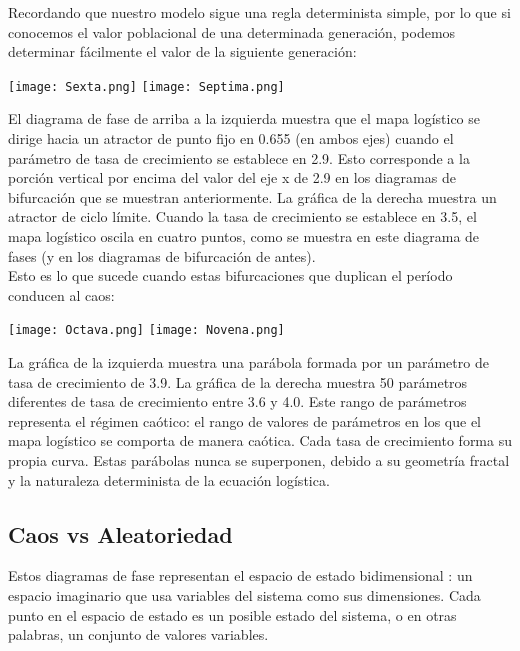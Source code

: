 \documentclass[12pt]{article}
\begin{document}
 Recordando que nuestro modelo sigue una regla determinista simple, por lo que si conocemos el valor poblacional de una determinada generación, podemos determinar fácilmente el valor de la siguiente generación:
 \begin{center}
    \texttt{[image: Sexta.png]} \hspace*{\fill}  \texttt{[image: Septima.png]}
\end{center}
El diagrama de fase de arriba a la izquierda muestra que el mapa logístico se dirige hacia un atractor de punto fijo en 0.655 (en ambos ejes) cuando el parámetro de tasa de crecimiento se establece en 2.9. Esto corresponde a la porción vertical por encima del valor del eje x de 2.9 en los diagramas de bifurcación que se muestran anteriormente. La gráfica de la derecha muestra un atractor de ciclo límite. Cuando la tasa de crecimiento se establece en 3.5, el mapa logístico oscila en cuatro puntos, como se muestra en este diagrama de fases (y en los diagramas de bifurcación de antes).\\

Esto es lo que sucede cuando estas bifurcaciones que duplican el período conducen al caos:
\begin{center}
    \texttt{[image: Octava.png]} \hspace*{\fill}  \texttt{[image: Novena.png]}
\end{center}
La gráfica de la izquierda muestra una parábola formada por un parámetro de tasa de crecimiento de 3.9. La gráfica de la derecha muestra 50 parámetros diferentes de tasa de crecimiento entre 3.6 y 4.0. Este rango de parámetros representa el régimen caótico: el rango de valores de parámetros en los que el mapa logístico se comporta de manera caótica. Cada tasa de crecimiento forma su propia curva. Estas parábolas nunca se superponen, debido a su geometría fractal y la naturaleza determinista de la ecuación logística.
\subsection*{Caos vs Aleatoriedad}
Estos diagramas de fase representan el espacio de estado bidimensional : un espacio imaginario que usa variables del sistema como sus dimensiones. Cada punto en el espacio de estado es un posible estado del sistema, o en otras palabras, un conjunto de valores variables.\\
\end{document}
